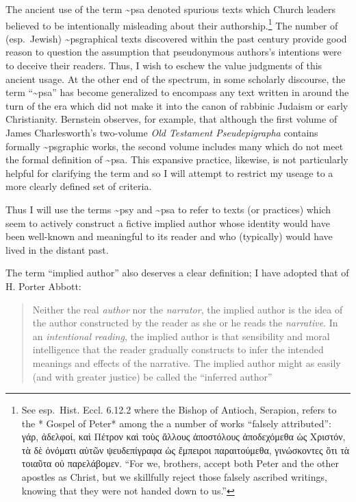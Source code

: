 The ancient use of the term \textasciitilde{}psa denoted spurious texts
which Church leaders believed to be intentionally misleading about their
authorship.\footnote{See esp.~Hist. Eccl. 6.12.2 where the Bishop of
  Antioch, Serapion, refers to the * Gospel of Peter* among the a number
  of works ``falsely attributed'': γάρ, ἀδελφοί, καὶ Πέτρον καὶ τοὺς
  ἄλλους ἀποστόλους ἀποδεχόμεθα ὡς Χριστόν, τὰ δὲ ὀνόματι αὐτῶν
  ψευδεπίγραφα ὡς ἔμπειροι παραιτούμεθα, γινώσκοντες ὅτι τὰ τοιαῦτα οὐ
  παρελάβομεν. ``For we, brothers, accept both Peter and the other
  apostles as Christ, but we skillfully reject those falsely ascribed
  writings, knowing that they were not handed down to us.''} The number
of (esp.~Jewish) \textasciitilde{}psgraphical texts discovered within
the past century provide good reason to question the assumption that
pseudonymous authors's intentions were to deceive their
readers.\autocites[53--58]{mroczek2016}[See also][]{reed_jts2009} Thus,
I wish to eschew the value judgments of this ancient usage. At the other
end of the spectrum, in some scholarly discourse, the term
``\textasciitilde{}psa'' has become generalized to encompass any text
written in around the turn of the era which did not make it into the
canon of rabbinic Judaism or early Christianity. Bernstein observes, for
example, that although the first volume of James Charlesworth's
two-volume \emph{Old Testament Pseudepigrapha} contains formally
\textasciitilde{}psgraphic works, the second volume includes many which
do not meet the formal definition of
\textasciitilde{}psa.\autocites[2]{bernstein_chazon-etal1999}{charlesworth_OTP}
This expansive practice, likewise, is not particularly helpful for
clarifying the term and so I will attempt to restrict my useage to a
more clearly defined set of criteria.

Thus I will use the terms \textasciitilde{}psy and \textasciitilde{}psa
to refer to texts (or practices) which seem to actively construct a
fictive implied author whose identity would have been well-known and
meaningful to its reader and who (typically) would have lived in the
distant past.

The term ``implied author'' also deserves a clear definition; I have
adopted that of H. Porter Abbott:

\begin{quote}
Neither the real \emph{author} nor the \emph{narrator}, the implied
author is the idea of the author constructed by the reader as she or he
reads the \emph{narrative}. In an \emph{intentional reading}, the
implied author is that sensibility and moral intelligence that the
reader gradually constructs to infer the intended meanings and effects
of the narrative. The implied author might as easily (and with greater
justice) be called the ``inferred author'' \autocite[235]{abbott2008}
\end{quote}

